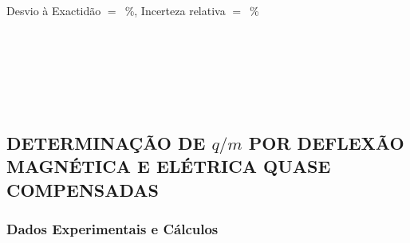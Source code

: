 \documentclass[a4paper,12pt]{article}  %
\begin{document}
\noindent  Desvio à Exactidão $=$~\underline{\makebox[1cm][r]{~}}\%, 
Incerteza relativa $=$~\underline{\makebox[1cm][r]{~}}\% 

\noindent\underline{\makebox[\textwidth][r]{~}} \\
\noindent\underline{\makebox[\textwidth][r]{~}} \\
\noindent\underline{\makebox[\textwidth][r]{~}} \\
\noindent\underline{\makebox[\textwidth][r]{~}} \\
\noindent\underline{\makebox[\textwidth][r]{~}} \\

\newpage

\subsection{\sf DETERMINAÇÃO DE $q/m$ POR DEFLEXÃO\\ MAGNÉTICA E ELÉTRICA QUASE COMPENSADAS }

\subsubsection{\sf Dados Experimentais e Cálculos}
\end{document}
